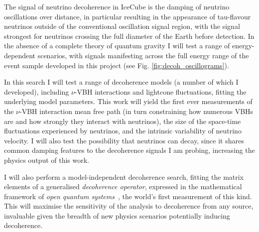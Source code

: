 \documentclass[a4paper,11pt]{article}
\begin{document}
The signal of neutrino decoherence in IceCube is the damping of neutrino oscillations over distance, in particular resulting in the appearance of tau-flavour neutrinos outside of the conventional oscillation signal region, with the signal strongest for neutrinos crossing the full diameter of the Earth before detection. In the absence of a complete theory of quantum gravity I will test a range of energy-dependent scenarios, with signals manifesting across the full energy range of the event sample developed in this project (see Fig. \ref{fig:decoh_oscillograms}).

In this search I will test a range of decoherence models (a number of which I developed), including $\nu$-VBH interactions and lightcone fluctuations, fitting the underlying model parameters. This work will yield the first ever measurements of the $\nu$-VBH interaction mean free path (in turn constraining how numerous VBHs are and how strongly they interact with neutrinos), the size of the space-time fluctuations experienced by neutrinos, and the intrinsic variability of neutrino velocity. I will also test the possibility that neutrinos can decay, since it shares common damping features to the decoherence signals I am probing, increasing the physics output of this work.


I will also perform a model-independent decoherence search, fitting the matrix elements of a generalised \textit{decoherence operator}, expressed in the mathematical framework of \textit{open quantum systems}~\cite{lindblad1976, Benatti_2000, gago2002study, PhysRevLett.85.1166}, the world's first measurement of this kind. This will maximise the sensitivity of the analysis to decoherence from any source, invaluable given the breadth of new physics scenarios potentially inducing decoherence. 


\end{document}
